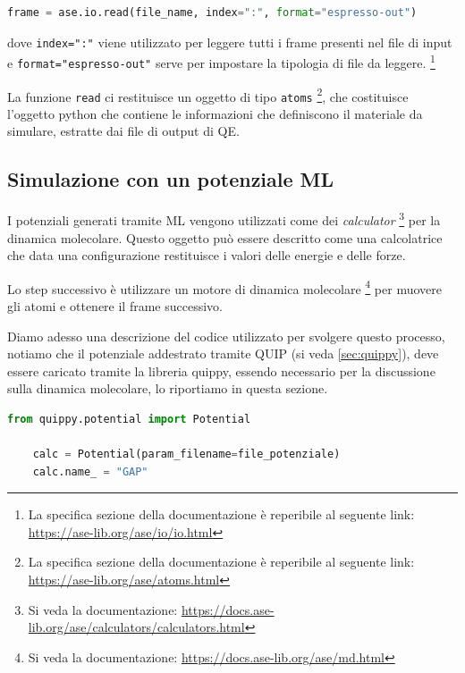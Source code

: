 \documentclass[a4paper,11pt,openany]{book}
\begin{document}
\begin{lstlisting}[caption={Snippet usato per il dataset A}, label={code:ase-dataset-a}, language=Python]
    frame = ase.io.read(file_name, index=":", format="espresso-out")
\end{lstlisting}

dove \texttt{index=":"} viene utilizzato per leggere tutti i frame presenti nel file di input e \texttt{format="espresso-out"} serve per impostare la tipologia di file da leggere.
\footnote{
La specifica sezione della documentazione è reperibile al seguente link: \url{https://ase-lib.org/ase/io/io.html}
}

La funzione \texttt{read} ci restituisce un oggetto di tipo \texttt{atoms}
\footnote{
La specifica sezione della documentazione è reperibile al seguente link: \url{https://ase-lib.org/ase/atoms.html}
}, che costituisce l'oggetto python che contiene le informazioni che definiscono il materiale da simulare, estratte dai file di output di QE.


\subsection{Simulazione con un potenziale ML}

I potenziali generati tramite ML vengono utilizzati come dei \textit{calculator} \footnote{Si veda la documentazione: \url{https://docs.ase-lib.org/ase/calculators/calculators.html}} per la dinamica molecolare.
Questo oggetto può essere descritto come una calcolatrice che data una configurazione restituisce i valori delle energie e delle forze.

Lo step successivo è utilizzare un motore di dinamica molecolare \footnote{Si veda la documentazione: \url{https://docs.ase-lib.org/ase/md.html}}
per muovere gli atomi e ottenere il frame successivo.

Diamo adesso una descrizione del codice utilizzato per svolgere questo processo, notiamo che il potenziale addestrato tramite QUIP (si veda \autoref{sec:quippy}), deve essere caricato tramite la libreria quippy, essendo necessario per la discussione sulla dinamica molecolare, lo riportiamo in questa sezione.

\begin{lstlisting}[caption={Loading del potenziale addestrato}, label={code:potential-loading-ase-md}, language=Python]
    from quippy.potential import Potential
    
    calc = Potential(param_filename=file_potenziale)
    calc.name_ = "GAP" 
\end{lstlisting}
\end{document}
